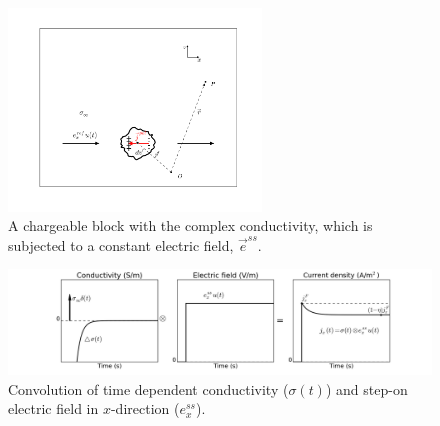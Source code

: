 \documentclass[a4paper, 11pt]{article}
\newcommand {\e}  { {\vec e} }
\begin{document}
\begin{figure}[htb]
  \centering
  \includegraphics[width=0.6\textwidth]{figures/ChargeableBlock.png}
  \caption{A chargeable block with the complex conductivity, which is subjected to a constant electric field, $\e^{ss}$.}
  \label{Fig:ChargeableBlock}
\end{figure}
\begin{figure}[htb]
  \centering
  \includegraphics[width=1.0\textwidth]{figures/Convolution_es.png}
  \caption{Convolution of time dependent conductivity ($\sigma(t)$) and step-on electric field in $x$-direction ($e^{ss}_x$). }
  \label{Fig:Convolution_es}
\end{figure}

\clearpage
\end{document}
